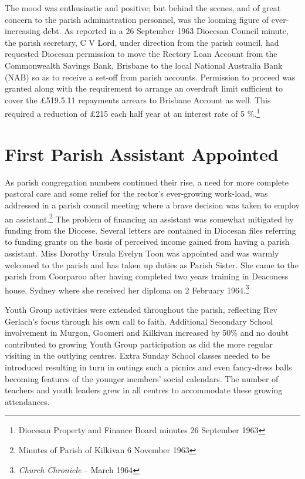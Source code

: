 The mood was enthusiastic and positive; but behind the scenes, and of great concern to the parish administration personnel, was the looming figure of ever-increasing debt. As reported in a 26 September 1963 Diocesan Council minute, the parish secretary, C V Lord, under direction from the parish council, had requested Diocesan permission to move the Rectory Loan Account from the Commonwealth Savings Bank, Brisbane to the local National Australia Bank (NAB) so as to receive a set-off from parish accounts. Permission to proceed was granted along with the requirement to arrange an overdraft limit sufficient to cover the \pounds519.5.11 repayments arrears to Brisbane Account as well. This required a reduction of \pounds215 each half year at an interest rate of 5  \%.\footnote{Diocesan Property and Finance Board minutes 26 September 1963}


\section{First Parish Assistant Appointed}



As parish congregation numbers continued their rise, a need for more complete pastoral care and some relief for the rector's ever-growing work-load, was addressed in a parish council meeting where a brave decision was taken to employ an assistant.\footnote{Minutes of Parish of Kilkivan 6 November 1963} The problem of financing an assistant was somewhat mitigated by funding from the Diocese. Several letters are contained in Diocesan files referring to funding grants on the basis of perceived income gained from having a parish assistant. Miss Dorothy Ursula Evelyn Toon was appointed and was warmly welcomed to the parish and has taken up duties as Parish Sister. She came to the parish from Coorparoo after having completed two years training in Deaconess house, Sydney where she received her diploma on 2 February 1964.\footnote{\emph{Church Chronicle} -- March 1964}


Youth Group activities were extended throughout the parish, reflecting Rev Gerlach's focus through his own call to faith. Additional Secondary School involvement in Murgon, Goomeri and Kilkivan increased by 50\% and no doubt contributed to growing Youth Group participation as did the more regular visiting in the outlying centres. Extra Sunday School classes needed to be introduced resulting in turn in outings such a picnics and even fancy-dress balls becoming features of the younger members' social calendars. The number of teachers and youth leaders grew in all centres to accommodate these growing attendances.



